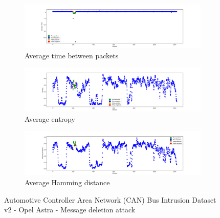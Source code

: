 \begin{figure}
    \centering
    \begin{subfigure}[b]{\linewidth}
        \includegraphics[width = \linewidth]{img/parts/app/tests/tue/OpelAstra/deletion/AvgTime.png}
        \caption{Average time between packets}
        \label{subfig:extract_tue_opelastra_deletion_avgtime}
    \end{subfigure}
    \begin{subfigure}[b]{\linewidth}
        \includegraphics[width = \linewidth]{img/parts/app/tests/tue/OpelAstra/deletion/Entropy.png}
        \caption{Average entropy}
        \label{subfig:extract_tue_opelastra_deletion_entropy}
    \end{subfigure}
    \begin{subfigure}[b]{\linewidth}
        \includegraphics[width = \linewidth]{img/parts/app/tests/tue/OpelAstra/deletion/HammingDist.png}
        \caption{Average Hamming distance}
        \label{subfig:extract_tue_opelastra_deletion_hammingdist}
    \end{subfigure}
    \caption{Automotive Controller Area Network (CAN) Bus Intrusion Dataset v2 - Opel Astra - Message deletion attack}
    \label{fig:extract_tue_opelastra_deletion}
\end{figure}

